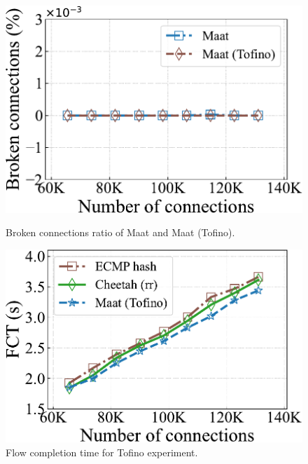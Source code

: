\begin{figure}[h]
\begin{minipage}{0.245\textwidth}
		\includegraphics[width=1\textwidth]{experiment/10broken.pdf}
		\caption{Broken connections ratio of Maat and Maat (Tofino).}
		\label{15}
	\end{minipage}
	\begin{minipage}{0.245\textwidth}
		\centering
		\includegraphics[width=1\textwidth]{experiment/11tofinofct.pdf}
		\caption{Flow completion time for Tofino experiment.}
		\label{16}
	\end{minipage}
\end{figure}

